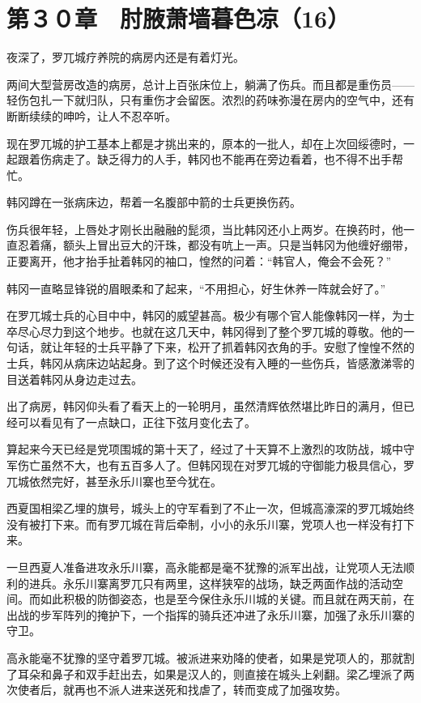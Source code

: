 \section{第３０章　肘腋萧墙暮色凉（16）}

夜深了，罗兀城疗养院的病房内还是有着灯光。

两间大型营房改造的病房，总计上百张床位上，躺满了伤兵。而且都是重伤员——轻伤包扎一下就归队，只有重伤才会留医。浓烈的药味弥漫在房内的空气中，还有断断续续的呻吟，让人不忍卒听。

现在罗兀城的护工基本上都是才挑出来的，原本的一批人，却在上次回绥德时，一起跟着伤病走了。缺乏得力的人手，韩冈也不能再在旁边看着，也不得不出手帮忙。

韩冈蹲在一张病床边，帮着一名腹部中箭的士兵更换伤药。

伤兵很年轻，上唇处才刚长出融融的髭须，当比韩冈还小上两岁。在换药时，他一直忍着痛，额头上冒出豆大的汗珠，都没有吭上一声。只是当韩冈为他缠好绷带，正要离开，他才抬手扯着韩冈的袖口，惶然的问着：“韩官人，俺会不会死？”

韩冈一直略显锋锐的眉眼柔和了起来，“不用担心，好生休养一阵就会好了。”

在罗兀城士兵的心目中中，韩冈的威望甚高。极少有哪个官人能像韩冈一样，为士卒尽心尽力到这个地步。也就在这几天中，韩冈得到了整个罗兀城的尊敬。他的一句话，就让年轻的士兵平静了下来，松开了抓着韩冈衣角的手。安慰了惶惶不然的士兵，韩冈从病床边站起身。到了这个时候还没有入睡的一些伤兵，皆感激涕零的目送着韩冈从身边走过去。

出了病房，韩冈仰头看了看天上的一轮明月，虽然清辉依然堪比昨日的满月，但已经可以看见有了一点缺口，正往下弦月变化去了。

算起来今天已经是党项围城的第十天了，经过了十天算不上激烈的攻防战，城中守军伤亡虽然不大，也有五百多人了。但韩冈现在对罗兀城的守御能力极具信心，罗兀城依然完好，甚至永乐川寨也至今犹在。

西夏国相梁乙埋的旗号，城头上的守军看到了不止一次，但城高濠深的罗兀城始终没有被打下来。而有罗兀城在背后牵制，小小的永乐川寨，党项人也一样没有打下来。

一旦西夏人准备进攻永乐川寨，高永能都是毫不犹豫的派军出战，让党项人无法顺利的进兵。永乐川寨离罗兀只有两里，这样狭窄的战场，缺乏两面作战的活动空间。而如此积极的防御姿态，也是至今保住永乐川城的关键。而且就在两天前，在出战的步军阵列的掩护下，一个指挥的骑兵还冲进了永乐川寨，加强了永乐川寨的守卫。

高永能毫不犹豫的坚守着罗兀城。被派进来劝降的使者，如果是党项人的，那就割了耳朵和鼻子和双手赶出去，如果是汉人的，则直接在城头上剁翻。梁乙埋派了两次使者后，就再也不派人进来送死和找虐了，转而变成了加强攻势。

